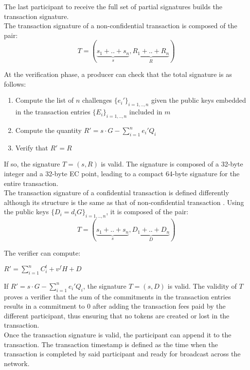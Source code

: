 The last participant to receive the full set of partial signatures builds the transaction signature.\\

 The transaction signature of a non-confidential transaction is composed of the pair:
\begin{equation} 
T= (\underbrace{s_{1}+..+s_{n}}_{s}, \underbrace{R_{1}+..+R_{n}}_{R})
\end{equation}

At the verification phase, a producer can check that the total signature is as follows:
\begin{enumerate}
\item Compute the list of $n$ challenges $\{e_i'\}_{i=1,..,n}$ given the public keys embedded in the transaction entries $\{E_i\}_{i=1,..,n}$ included in $m$
\item Compute the quantity $R' = s \cdot G - \sum_{i=1}^{n}e_i'Q_i$
\item Verify that $R'=R$
\end{enumerate}

If so, the signature $T = (s,R)$ is valid. The signature is composed of a 32-byte integer and a 32-byte EC point, leading to a compact 64-byte signature for the entire transaction. \\

The transaction signature of a confidential transaction is defined differently although its structure is the same as that of non-confidential transaction . Using the public keys $\{D_i = d_iG\}_{i=1,..,n}$, it is composed of the pair:
\begin{equation} 
T= (\underbrace{s_{1}+..+s_{n}}_{s}, \underbrace{D_{1}+..+D_{n}}_{D})
\end{equation}

The verifier can compute:
\begin{center}
$R' = \sum_{i=1}^{n}C_i^t + v^fH + D$
\end{center}

If $R' = s \cdot G - \sum_{i=1}^{n}e_i'Q_i$, the signature $T = (s,D)$ is valid. The validity of $T$ proves a verifier that the sum of the commitments in the transaction entries results in a commitment to 0 after adding the transaction fees paid by the different participant, thus ensuring that no tokens are created or lost in the transaction. \\

Once the transaction signature is valid, the participant can append it to the transaction. The transaction timestamp is defined as the time when the transaction is completed by said participant and ready for broadcast across the network. 
